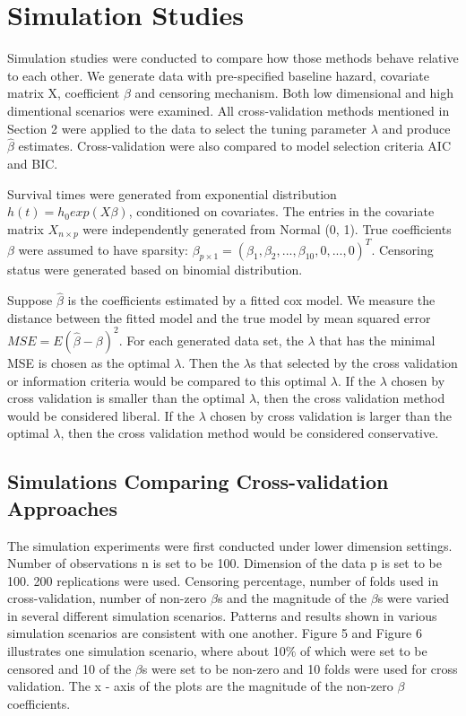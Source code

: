 \documentclass{article}\usepackage[]{graphicx}\usepackage[]{color}
\begin{document}
\section{Simulation Studies}

  Simulation studies were conducted to compare how those methods behave relative to each other. We generate data with pre-specified baseline hazard, covariate matrix X, coefficient $\beta$ and censoring mechanism. Both low dimensional and high dimentional scenarios were examined. All cross-validation methods mentioned in Section 2 were applied to the data to select the tuning parameter $\lambda$ and produce $\hat{\beta}$ estimates. Cross-validation were also compared to model selection criteria AIC and BIC.
  
  Survival times were generated from exponential distribution $h(t) = h_{0} exp(X\beta)$, conditioned on covariates. The entries in the covariate matrix $X_{n \times p}$ were independently generated from Normal (0, 1). True coefficients $\beta$  were assumed to have sparsity: $\beta_{p\times 1} = (\beta_{1},\beta_{2}, ..., \beta_{10}, 0, ..., 0)^{T}$.  Censoring status were generated based on binomial distribution.
  
  Suppose $\hat{\beta}$ is the coefficients estimated by a fitted cox model. We measure the distance between the fitted model and the true model by mean squared error $MSE = E(\hat{\beta} - \beta)^2$. For each generated data set, the $\lambda$ that has the minimal MSE is chosen as the optimal $\lambda$. Then the $\lambda$s that selected by the cross validation or information criteria would be compared to this optimal $\lambda$. If the $\lambda$ chosen by cross validation is smaller than the optimal $\lambda$, then the cross validation method would be considered liberal. If the $\lambda$ chosen by cross validation is larger than the optimal $\lambda$, then the cross validation method would be considered conservative. 
     
    \subsection {Simulations Comparing Cross-validation Approaches}
   The simulation experiments were first conducted under lower dimension settings. Number of observations n is set to be 100. Dimension of the data p is set to be 100. 200 replications were used. Censoring percentage, number of folds used in cross-validation, number of non-zero $\beta$s and the magnitude of the $\beta$s were varied in several different simulation scenarios. Patterns and results shown in various simulation scenarios are consistent with one another. Figure 5 and Figure 6 illustrates one simulation scenario, where about 10$\%$ of which were set to be censored and 10 of the $\beta$s were set to be non-zero and 10 folds were used for cross validation. The x - axis of the plots are the magnitude of the non-zero $\beta$ coefficients. 
   
\end{document}
